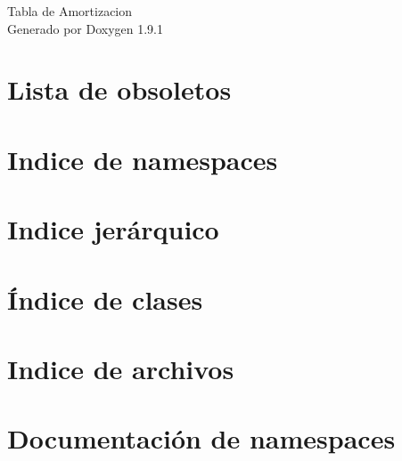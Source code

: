 \let\mypdfximage\pdfximage\def\pdfximage{\immediate\mypdfximage}\documentclass[twoside]{book}
\newcommand{\+}{\discretionary{\mbox{\scriptsize$\hookleftarrow$}}{}{}}
\newcommand{\clearemptydoublepage}{%
  \newpage{\pagestyle{empty}\cleardoublepage}%
}
\begin{document}
\raggedbottom

\hypersetup{pageanchor=false,
             bookmarksnumbered=true,
             pdfencoding=unicode
            }
\begin{titlepage}
\vspace*{7cm}
\begin{center}%
{\Large Tabla de Amortizacion }\\
\vspace*{1cm}
{\large Generado por Doxygen 1.9.1}\\
\end{center}
\end{titlepage}
\clearemptydoublepage
{}
\tableofcontents
\clearemptydoublepage
{}
\hypersetup{pageanchor=true}

\chapter{Lista de obsoletos}
\label{deprecated}

\chapter{Indice de namespaces}

\chapter{Indice jerárquico}

\chapter{Índice de clases}

\chapter{Indice de archivos}

\chapter{Documentación de namespaces}















\end{document}
